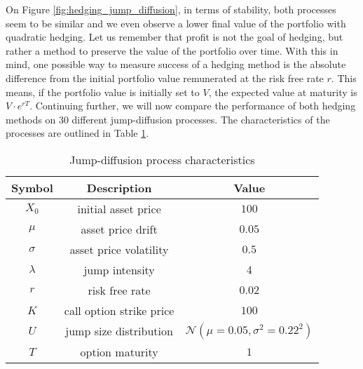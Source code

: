 \documentclass[times, utf8, diplomski]{fer}
\begin{document}
\noindent On Figure \ref{fig:hedging_jump_diffusion}, in terms of stability, both processes seem to be similar and we even observe a lower final value of the portfolio with quadratic hedging. Let us remember that profit is not the goal of hedging, but rather a method to preserve the value of the portfolio over time. With this in mind, one possible way to measure success of a hedging method is the absolute difference from the initial portfolio value remunerated at the risk free rate $r$. This means, if the portfolio value is initially set to $V$, the expected value at maturity is $V\cdot e^{rT}$. Continuing further, we will now compare the performance of both hedging methods on 30 different jump-diffusion processes. The characteristics of the processes are outlined in Table \ref{table:jd_characteristics}. \vspace{0.5cm}

\begin{table}
\centering
\begin{tabular}{c c c}
\hline
Symbol & Description & Value \\
\hline \hline
$X_0$ & initial asset price & $100$ \\
\hline
$\mu$ & asset price drift & $0.05$ \\
\hline
$\sigma$ & asset price volatility & $0.5$ \\
\hline
$\lambda$ & jump intensity & $4$ \\
\hline
$r$ & risk free rate & $0.02$ \\
\hline
$K$ & call option strike price & $100$ \\
\hline
$U$ & jump size distribution & $\mathcal{N}(\mu=0.05, \sigma^2 = 0.22^2)$ \\
\hline
$T$ & option maturity & $1$ \\
\hline
\end{tabular}
\caption{Jump-diffusion process characteristics}
\label{table:jd_characteristics}
\end{table}
\end{document}
